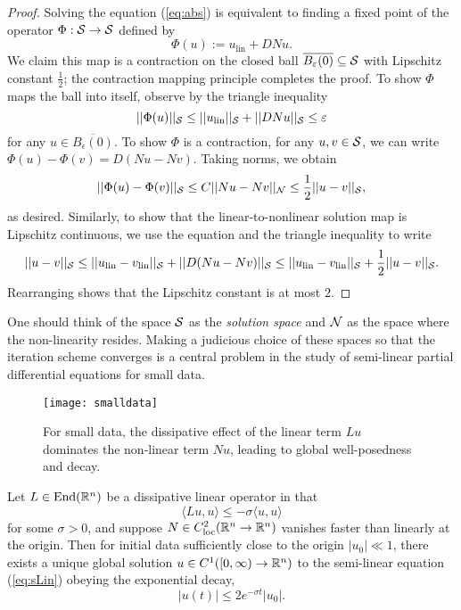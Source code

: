 \begin{proof}
	Solving the equation (\ref{eq:abs}) is equivalent to finding a fixed point of the operator $\Phi : \mathcal S \to \mathcal S$ defined by 
		\[ \Phi (u) := u_{\text{lin}} + DNu. \]
	We claim this map is a contraction on the closed ball $\overline{B_\varepsilon (0)} \subseteq \mathcal S$ with Lipschitz constant $\tfrac12$; the contraction mapping principle completes the proof. To show $\Phi$ maps the ball into itself, observe by the triangle inequality
		\[ ||\Phi (u)||_\mathcal S \leq ||u_{\text{lin}}||_\mathcal S + ||DNu||_\mathcal S \leq \varepsilon \]
	for any $u \in \overline{B_\epsilon (0)}$. To show $\Phi$ is a contraction, for any $u, v \in \mathcal S$, we can write $\Phi(u) - \Phi(v) = D(Nu - Nv)$. Taking norms, we obtain 
		\[ ||\Phi (u) - \Phi(v)||_\mathcal S \leq C ||Nu - Nv||_\mathcal N \leq  \frac12 ||u - v||_\mathcal S,  \]
	as desired. Similarly, to show that the linear-to-nonlinear solution map is Lipschitz continuous, we use the equation and the triangle inequality to write
		\[ ||u - v||_\mathcal S \leq ||u_{\text{lin}} - v_{\text{lin}}||_\mathcal S + ||D(Nu - Nv)||_\mathcal S \leq ||u_{\text{lin}} - v_{\text{lin}}||_\mathcal S + \frac12||u - v||_\mathcal S.  \]
	Rearranging shows that the Lipschitz constant is at most $2$. 	
\end{proof}

\begin{remark}
	One should think of the space $\mathcal S$ as the \textit{solution space} and $\mathcal N$ as the space where the non-linearity resides. Making a judicious choice of these spaces so that the iteration scheme converges is a central problem in the study of semi-linear partial differential equations for small data. 
\end{remark}

\begin{figure}[h]
	\begin{center}
		\texttt{[image: smalldata]}
		\caption{For small data, the dissipative effect of the linear term $Lu$ dominates the non-linear term $Nu$, leading to global well-posedness and decay. }
	\end{center}
\end{figure}

\begin{theorem}
	Let $L \in \operatorname{End} (\mathbb R^n)$ be a dissipative linear operator in that 
		\[ \langle Lu, u \rangle \leq - \sigma \langle u, u \rangle\]
	for some $\sigma > 0$, and suppose $N \in C^2_{\mathrm{loc}} (\mathbb R^n \to \mathbb R^n)$ vanishes faster than linearly at the origin. Then for initial data sufficiently close to the origin $|u_0| \ll 1$, there exists a unique global solution $u \in C^1 ([0, \infty) \to \mathbb R^n)$ to the semi-linear equation (\ref{eq:sLin}) obeying the exponential decay,
		\[ |u(t)| \leq 2 e^{-\sigma t} |u_0|. \]
\end{theorem}

